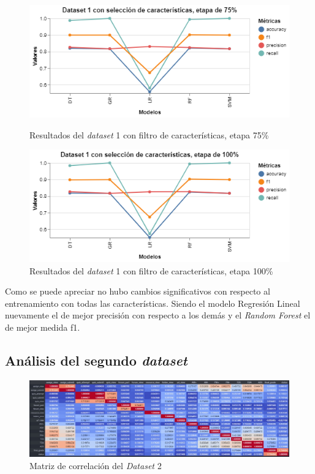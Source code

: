 \begin{figure}[htbp]
    \centering
    \begin{minipage}[t]{0.50\textwidth}
        \centering
        \includegraphics[width = \textwidth]{Graphics/dataset_1_fs_75.png}
        \caption{Resultados del \textit{dataset} 1 con filtro de características, etapa 75\%}
        \label{dataset1_fs_75}
    \end{minipage}\hfill
    \begin{minipage}[t]{0.50\textwidth}
        \centering
        \includegraphics[width = \textwidth]{Graphics/dataset_1_fs_100.png}
        \caption{Resultados del \textit{dataset} 1 con filtro de características, etapa 100\%}
        \label{dataset1_fs_100}
    \end{minipage}
\end{figure}   

Como se puede apreciar no hubo cambios significativos con respecto al entrenamiento con todas las características.  Siendo el modelo Regresión Lineal nuevamente el de mejor precisión con respecto a los demás y el \textit{Random Forest} el de mejor medida f1. 


\subsection{Análisis del segundo \textit{dataset}}

\begin{figure}[htb]
    \centering
    \includegraphics[width = 1 \textwidth]{Graphics/corr_dataset2.jpg}
    \caption{Matriz de correlación del \textit{Dataset} 2}
    \label{dataset2_corr}
\end{figure}  


